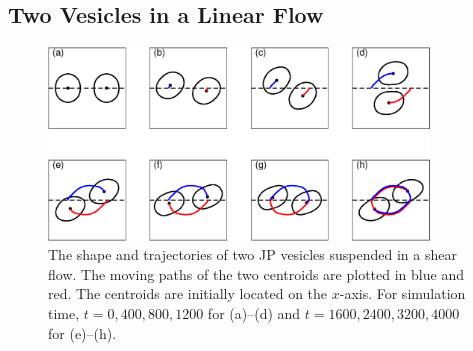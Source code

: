 \documentclass[lineno]{jfm}
\begin{document}
\subsection{Two Vesicles in a Linear Flow}

\begin{figure}
\begin{center}
  \includegraphics[width=0.9\textwidth]{ShearTraj.eps}
\end{center} 
  \caption{\label{figure9} The shape and trajectories of two
  JP vesicles suspended in a shear flow. The moving paths of the two
  centroids are plotted in blue and red. The centroids are initially
  located on the $x$-axis. For simulation time, $t = {0, 400,800,1200}$
  for (a)--(d) and $t = {1600, 2400, 3200, 4000}$ for (e)--(h).}
\end{figure}
\end{document}
